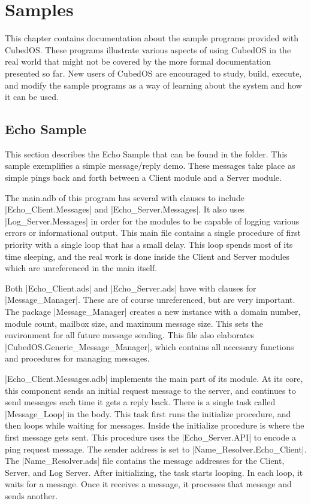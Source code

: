 
\section{Samples}
\label{sec:manual-samples}

This chapter contains documentation about the sample programs provided with Cubed\-OS. These
programs illustrate various aspects of using CubedOS in the real world that might not be
covered by the more formal documentation presented so far. New users of CubedOS are encouraged to
study, build, execute, and modify the sample programs as a way of learning about the system and
how it can be used.

\subsection{Echo Sample}
\label{sec:manual-echo-sample}

This section describes the Echo Sample that can be found in the  folder.
This sample exemplifies a simple message/reply demo. These messages take place as simple pings
back and forth between a Client module and a Server module.

The main.adb of this program has several with clauses to include |Echo_Client.Messages| and
|Echo_Server.Messages|. It also uses |Log_Server.Messages| in order for the modules to be
capable of logging various errors or informational output. This main file contains a single
procedure of first priority with a single loop that has a small delay. This loop spends most of
its time sleeping, and the real work is done inside the Client and Server modules which are
unreferenced in the main itself.

Both |Echo_Client.ads| and |Echo_Server.ads| have with clauses for |Message_Manager|. These are
of course unreferenced, but are very important. The package |Message_Manager| creates a new
instance with a domain number, module count, mailbox size, and maximum message size. This sets
the environment for all future message sending. This file also elaborates
|CubedOS.Generic_Message_Manager|, which contains all necessary functions and procedures for
managing messages.

|Echo_Client.Messages.adb| implements the main part of its module. At its core, this component
sends an initial request message to the server, and continues to send messages each time it gets
a reply back. There is a single task called |Message_Loop| in the body. This task first runs the
initialize procedure, and then loops while waiting for messages. Inside the initialize procedure
is where the first message gets sent. This procedure uses the |Echo_Server.API| to encode a ping
request message. The sender address is set to |Name_Resolver.Echo_Client|. The
|Name_Resolver.ads| file contains the message addresses for the Client, Server, and Log Server.
After initializing, the task starts looping. In each loop, it waits for a message. Once it
receives a message, it processes that message and sends another.

